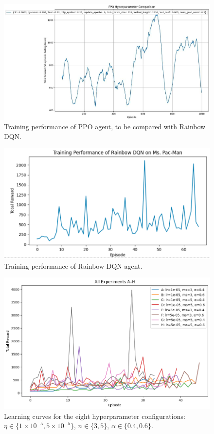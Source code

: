 \documentclass{article}
\begin{document}
\begin{figure}[htbp]
  \centering
  \includegraphics[width=0.85\linewidth]{left.jpg}
  \caption{Training performance of PPO agent, to be compared with Rainbow DQN.}
  \label{fig:ppo}
\end{figure}
\begin{figure}[htbp]
  \centering
  \includegraphics[width=0.85\linewidth]{right.png}
  \caption{Training performance of Rainbow DQN agent.}
  \label{fig:rainbow}
\end{figure}

\begin{figure}[htbp]
  \centering
  \includegraphics[width=0.8\linewidth]{rainbow_8Regular.png}
  \caption{Learning curves for the eight hyperparameter configurations:
           \(\eta\in\{1\times10^{-5},5\times10^{-5}\}\), 
           \(n\in\{3,5\}\), 
           \(\alpha\in\{0.4,0.6\}\).}
  \label{fig:ablation}
\end{figure}
\end{document}
